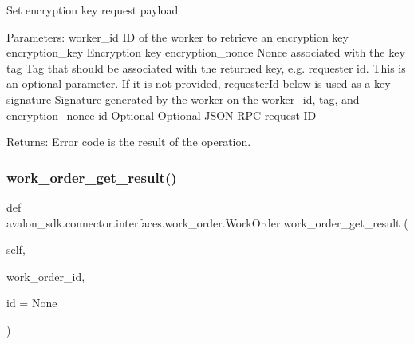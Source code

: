\begin{DoxyVerb}Set encryption key request payload

Parameters:
worker_id        ID of the worker to retrieve an encryption key
encryption_key   Encryption key
encryption_nonce Nonce associated with the key
tag              Tag that should be associated with the returned key,
         e.g. requester id. This is an optional parameter.
         If it is not provided, requesterId below is used
         as a key
signature        Signature generated by the worker on the worker_id,
         tag, and encryption_nonce
id               Optional Optional JSON RPC request ID

Returns:
Error code is the result of the operation.
\end{DoxyVerb}
 \mbox{\label{classavalon__sdk_1_1connector_1_1interfaces_1_1work__order_1_1WorkOrder_ad7a0339a6048e7c2d91792a5cf293a3e}} 
\subsubsection{\texorpdfstring{work\+\_\+order\+\_\+get\+\_\+result()}{work\_order\_get\_result()}}
{\footnotesize\ttfamily def avalon\+\_\+sdk.\+connector.\+interfaces.\+work\+\_\+order.\+Work\+Order.\+work\+\_\+order\+\_\+get\+\_\+result (\begin{DoxyParamCaption}\item[{}]{self,  }\item[{}]{work\+\_\+order\+\_\+id,  }\item[{}]{id = {\ttfamily None} }\end{DoxyParamCaption})}

